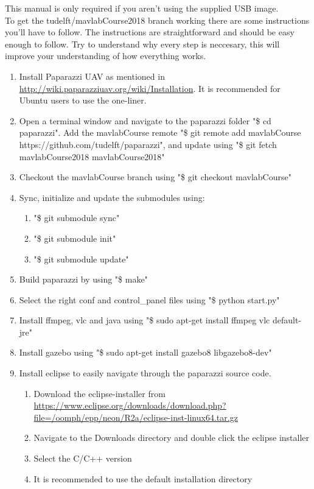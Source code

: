 \documentclass{article}
\begin{document}
This manual is only required if you aren't using the supplied USB image.\\

\noindent To get the tudelft/mavlabCourse2018 branch working there are some instructions you'll have to follow. The instructions are straightforward and should be easy enough to follow. Try to understand why every step is neccesary, this will improve your understanding of how everything works.

\begin{enumerate}
\item{Install Paparazzi UAV as mentioned in \url{http://wiki.paparazziuav.org/wiki/Installation}. It is recommended for Ubuntu users to use the one-liner.}
\item{Open a terminal window and navigate to the paparazzi folder "\$ cd paparazzi". Add the mavlabCourse remote "\$ git remote add mavlabCourse https://github.com/tudelft/paparazzi", and update using "\$ git fetch mavlabCourse2018 mavlabCourse2018"}
\item{Checkout the mavlabCourse branch using "\$ git checkout mavlabCourse"}
\item{Sync, initialize and update the submodules using:
\begin{enumerate}
\item{"\$ git submodule sync"}
\item{"\$ git submodule init"}
\item{"\$ git submodule update"}
\end{enumerate}
}
\item{Build paparazzi by using "\$ make"}
\item{Select the right conf and control\_panel files using "\$ python start.py"}
\item{Install ffmpeg, vlc and java using "\$ sudo apt-get install ffmpeg vlc default-jre"}
\item{Install gazebo using "\$ sudo apt-get install gazebo8 libgazebo8-dev"}
\item{Install eclipse to easily navigate through the paparazzi source code.
\begin{enumerate}
\item{Download the eclipse-installer from \url{https://www.eclipse.org/downloads/download.php?file=/oomph/epp/neon/R2a/eclipse-inst-linux64.tar.gz}}
\item{Navigate to the Downloads directory and double click the eclipse installer}
\item{Select the C/C++ version}
\item{It is recommended to use the default installation directory}

\end{enumerate}}
\end{enumerate}
\end{document}
